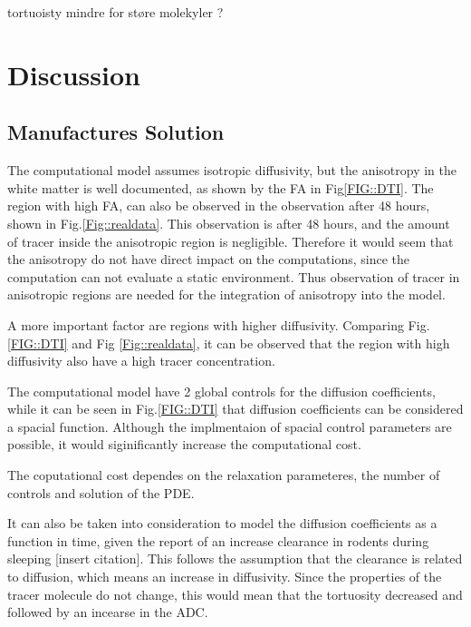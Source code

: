 \documentclass[11pt,a4paper]{article}
\begin{document}
{\color{red} tortuoisty mindre for støre molekyler ? }

\section{Discussion}


\subsection{Manufactures Solution}
The computational model assumes isotropic diffusivity, but the anisotropy in the white matter is well documented, as shown by the FA in Fig\ref{FIG::DTI}. The region with high FA, can also be observed in the observation after 48 hours, shown in Fig.\ref{Fig::realdata}. This observation is after 48 hours, and the amount of tracer inside the anisotropic region is negligible. Therefore it would seem that the anisotropy do not have direct impact on the computations, since the computation can not evaluate a static environment. Thus observation of tracer in anisotropic regions are needed for the integration of anisotropy into the model. 
  
A more important factor are regions with higher diffusivity. Comparing Fig.\ref{FIG::DTI} and Fig \ref{Fig::realdata}, it can be observed that the region with high diffusivity also have a high tracer concentration. 

The computational model have 2 global controls for the diffusion coefficients, while it can be seen in  Fig.\ref{FIG::DTI} that diffusion coefficients can be considered a spacial function. Although the implmentaion of spacial control parameters are possible, it would siginificantly increase the computational cost. 

The coputational cost dependes on the relaxation parameteres, the number of controls and solution of the PDE.

   
  
It can also be taken into consideration to model the diffusion coefficients as a function in time, given the report of an increase clearance in rodents during sleeping [insert citation]. This follows the assumption that the clearance is related to diffusion, which means an increase in diffusivity. Since the properties of the tracer molecule do not change, this would mean that the tortuosity decreased and followed by an incearse in the ADC.
\end{document}
